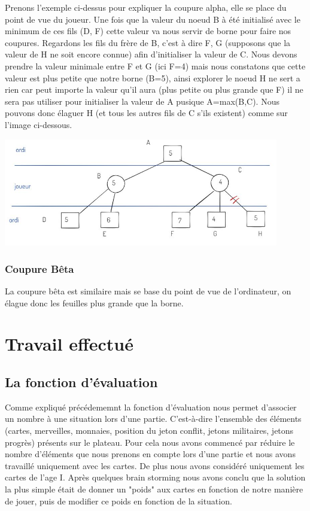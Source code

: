 \documentclass[a4paper, 12pt, french]{article}
\begin{document}
	Prenons l'exemple ci-dessus pour expliquer la coupure alpha, elle se place du point de vue du joueur.
	Une fois que la valeur du noeud B à été initialisé avec le minimum de ces fils (D, F) cette valeur va nous
	servir de borne pour faire nos coupures. Regardons les fils du frère de B, c'est à dire F, G (supposons que
	la valeur de H ne soit encore connue) afin d'initialiser la valeur de C. Nous devons prendre la valeur minimale
	entre F et G (ici F=4) mais nous constatons que cette valeur est plus petite que notre borne (B=5), ainsi explorer
	le noeud H ne sert a rien car peut importe la valeur qu'il aura (plus petite ou plus grande que F) il ne sera pas
	utiliser pour initialiser la valeur de A pusique A=max(B,C). Nous pouvons donc élaguer H (et tous les autres fils
	de C s'ils existent) comme sur l'image ci-dessous.

	\includegraphics[width=12cm]{images/elagageAlphaSuite.JPG}

	\subsubsection{Coupure Bêta}
	La coupure bêta est similaire mais se base du point de vue de l'ordinateur, on élague donc les
	feuilles plus grande que la borne\cite{wiki_7_wonder}.

	\section{Travail effectué}
	\subsection{La fonction d'évaluation}
	Comme expliqué précédememnt la fonction d'évaluation nous permet d'associer un nombre à une situation 
	lors d'une partie. C'est-à-dire l'ensemble
	des éléments (cartes, merveilles, monnaies, position du jeton conflit, jetons militaires, jetons progrès)
	présents sur le plateau. Pour cela nous avons commencé par réduire le nombre d'éléments que nous prenons en
	compte lors d'une partie et nous avons travaillé uniquement avec les cartes. De plus nous avons considéré
	uniquement les cartes de l'age I. Après quelques brain storming nous avons conclu que la solution la
	plus simple était de donner un "poids" aux cartes en fonction de notre manière de jouer, puis de modifier ce poids
	en fonction de la situation.
\end{document}

